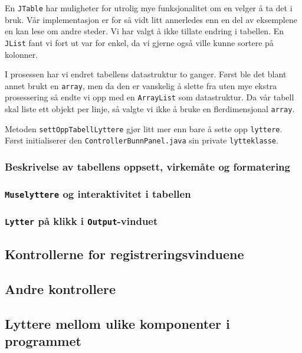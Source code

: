 En \texttt{JTable} har muligheter for utrolig mye funksjonalitet om en velger å ta det i bruk.
Vår implementasjon er for så vidt litt annerledes enn en del av eksemplene en kan lese om andre steder. Vi har valgt å ikke tillate endring i tabellen. En \texttt{JList} fant vi fort ut var for enkel, da vi gjerne også ville kunne sortere på kolonner.

I prosessen har vi endret tabellens datastruktur to ganger. Først ble det blant annet brukt en \texttt{array}, men da den er vanskelig å slette fra uten mye ekstra prosessering så endte vi opp med en \texttt{ArrayList} som datastruktur. Da vår tabell skal liste ett objekt per linje, så valgte vi ikke å bruke en flerdimensjonal \texttt{array}. 

Metoden \texttt{settOppTabellLyttere} gjør litt mer enn bare å sette opp \texttt{lyttere}. Først initialiserer den \texttt{ControllerBunnPanel.java} sin private \texttt{lytteklasse}. \\



\subsubsection{Beskrivelse av tabellens oppsett, virkemåte og formatering} \label{sec:virkemåtetabell}
\subsubsection{\texttt{Muselyttere} og interaktivitet i tabellen} \label{sec:interaktivitettabell}
\subsubsection{\texttt{Lytter} på klikk i \texttt{Output}-vinduet} \label{sec:lyttetoutputvindu}

\subsection{Kontrollerne for registreringsvinduene} \label{sec:regkontrollere}


\subsection{Andre kontrollere}


\subsection{Lyttere mellom ulike komponenter i programmet} \label{sec:kontrollerlyttere}